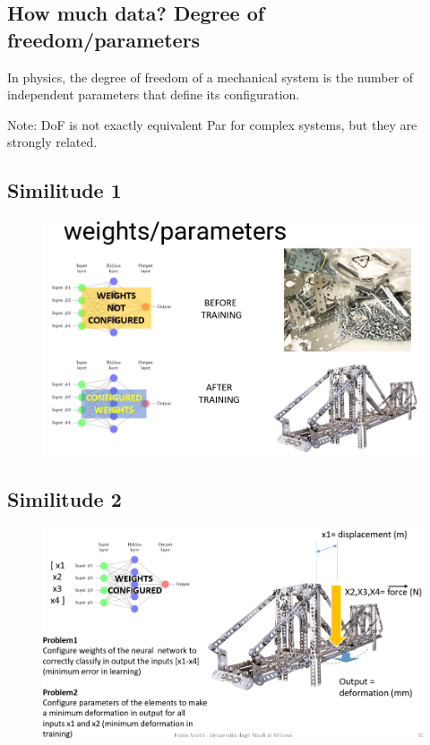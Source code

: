 \documentclass{report}
\begin{document}
\subsection{How much data? Degree of freedom/parameters}
\noindent In physics, the degree of freedom of a mechanical system is the number of independent parameters that define its configuration.

\noindent Note: DoF is not exactly equivalent Par for complex systems, but they are strongly related.

\subsection{Similitude 1}
\begin{figure}[H]
    \centering
    \includegraphics[width=0.8\linewidth]{images/similitude 1.png}
\end{figure}

\subsection{Similitude 2}
\begin{figure}[H]
    \centering
    \includegraphics[width=0.8\linewidth]{images/similitude 2.png}
\end{figure}
\end{document}
